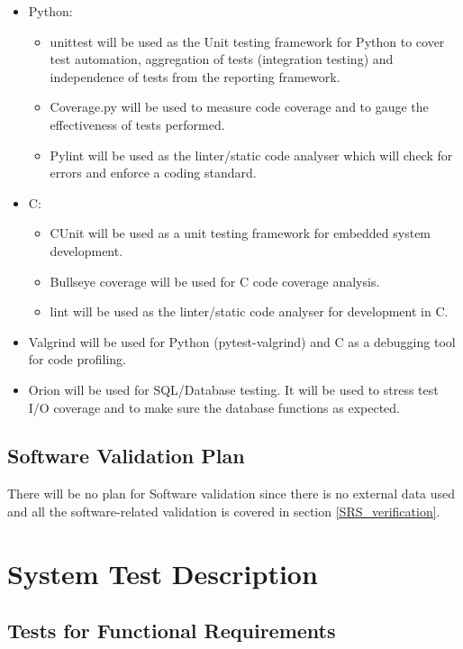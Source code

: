 \documentclass[12pt, titlepage]{article}
\begin{document}
\begin{itemize}
  \item Python:
        \begin{itemize}
          \item unittest will be used as the Unit testing framework for Python to cover test automation, aggregation of tests (integration 							testing) and independence of tests from the reporting framework.
          \item Coverage.py will be used to measure code coverage and to gauge the effectiveness of tests performed.
          \item Pylint will be used as the linter/static code analyser which will check for errors and enforce a coding standard.
        \end{itemize}
  \item C:
        \begin{itemize}
          \item CUnit will be used as a unit testing framework for embedded system development.
          \item Bullseye coverage will be used for C code coverage analysis.
          \item lint will be used as the linter/static code analyser for development in C.
        \end{itemize}
  \item Valgrind will be used for Python (pytest-valgrind) and C as a debugging tool for code profiling.
  \item Orion will be used for SQL/Database testing. It will be used to stress test I/O coverage and to make sure the database functions as expected.
\end{itemize}

\subsection{Software Validation Plan}

There will be no plan for Software validation since there is no external data used and all the software-related validation is covered in  section \ref{SRS_verification}.

\section{System Test Description}

\subsection{Tests for Functional Requirements}\label{sec_5_1}
\end{document}

